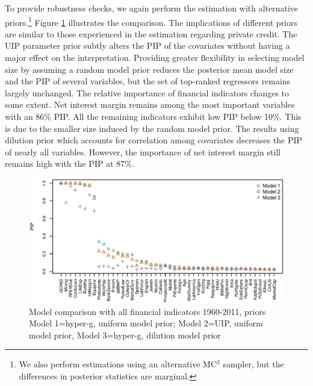 To provide robustness checks, we again perform the estimation with alternative priors.\footnote{We also perform estimations using an alternative MC$^{3}$ sampler, but the differences in posterior statistics are marginal.} Figure \ref{ch2fig:compall60} illustrates the comparison. The implications of different priors are similar to those experienced in the estimation regarding private credit. The \ac{UIP} parameter prior subtly alters the \ac{PIP} of the covariates without having a major effect on the interpretation. Providing greater flexibility in selecting model size by assuming a random model prior reduces the posterior mean model size and the \ac{PIP} of several variables, but the set of top-ranked regressors remains largely unchanged. The relative importance of financial indicators changes to some extent. Net interest margin remains among the most important variables with an 86\% \ac{PIP}. All the remaining indicators exhibit low \ac{PIP} below 10\%. This is due to the smaller size induced by the random model prior. The results using dilution prior which accounts for correlation among covariates decreases the \ac{PIP} of nearly all variables. However, the importance of net interest margin still remains high with the \ac{PIP} at 87\%.
\begin{figure}[!ht]
	\begin{center}
		\includegraphics[width=\linewidth]{Figures/ch2/plotCompall6011}
		\caption{Model comparison with all financial indicators 1960-2011, priors Model 1=hyper-g, uniform model prior; Model 2=\ac{UIP}, uniform model prior, Model 3=hyper-g, dilution model prior}
		\label{ch2fig:compall60}
	\end{center}
\end{figure}

